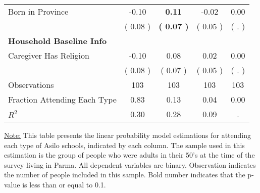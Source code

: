 \begin{table}[H]
{\begin{tabular}{lcccc}
\quad Born in Province &     -0.10 & \textbf{     0.11} &     -0.02 &      0.00 \\
\quad  & (     0.08 ) & \textbf{(     0.07 )}  & (     0.05 )  & (        . )  \\
\midrule
\textbf{Household Baseline Info} \\
\quad Caregiver Has Religion &     -0.10 &      0.08 &      0.02 &      0.00 \\
\quad  & (     0.08 ) & (     0.07 )  & (     0.05 )  & (        . )  \\
\midrule
Observations & 103 & 103 & 103 & 103 \\
Fraction Attending Each Type &      0.83 &      0.13 &      0.04 &      0.00 \\
\midrule
$ R^2$ &      0.30 &      0.28 &      0.09 &         . \\
\bottomrule
\end{tabular}}
\end{table}
\begin{footnotesize}
\noindent\underline{Note:} This table presents the linear probability model estimations for attending each type of Asilo schools, indicated by each column. The sample used in this estimation is the group of people who were adults in their 50's at the time of the survey living in Parma. All dependent variables are binary. Observation indicates the number of people included in this sample. Bold number indicates that the p-value is less than or equal to 0.1.
\end{footnotesize}
